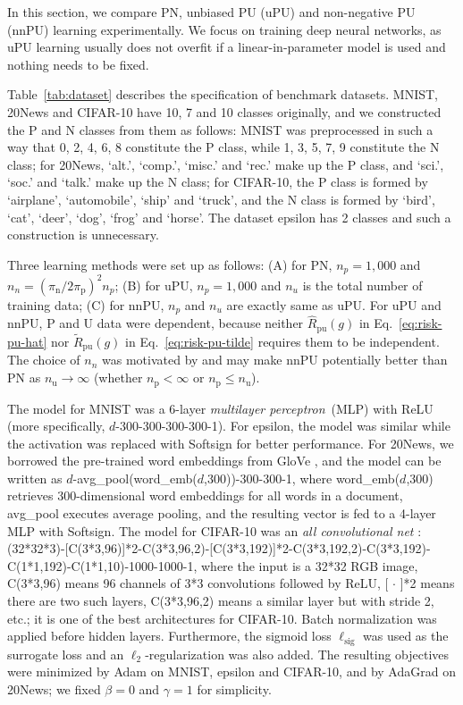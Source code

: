 \documentclass{article}
\newcommand{\pip}{\pi_\mathrm{p}}
\newcommand{\pin}{\pi_\mathrm{n}}
\newcommand{\Np}{{n_\mathrm{p}}}
\newcommand{\Nu}{{n_\mathrm{u}}}
\newcommand{\hRpu}{\widehat{R}_\mathrm{pu}}
\newcommand{\tRpu}{\widetilde{R}_\mathrm{pu}}
\newcommand{\ellsig}{\ell_\mathrm{sig}}
\begin{document}
In this section, we compare PN, unbiased PU (uPU) and non-negative PU (nnPU) learning experimentally. We focus on training deep neural networks, as uPU learning usually does not overfit if a linear-in-parameter model is used \citep{niu16nips} and nothing needs to be fixed.

Table~\ref{tab:dataset} describes the specification of benchmark datasets. MNIST, 20News and CIFAR-10 have 10, 7 and 10 classes originally, and we constructed the P and N classes from them as follows: MNIST was preprocessed in such a way that 0, 2, 4, 6, 8 constitute the P class, while 1, 3, 5, 7, 9 constitute the N class; for 20News, `alt.', `comp.', `misc.' and `rec.' make up the P class, and `sci.', `soc.' and `talk.' make up the N class; for CIFAR-10, the P class is formed by `airplane', `automobile', `ship' and `truck', and the N class is formed by `bird', `cat', `deer', `dog', `frog' and `horse'. The dataset epsilon has 2 classes and such a construction is unnecessary.

Three learning methods were set up as follows:
(A) for PN, $n_p=1,000$ and $n_n=(\pin/2\pip)^2n_p$;
(B) for uPU, $n_p=1,000$ and $n_u$ is the total number of training data;
(C) for nnPU, $n_p$ and $n_u$ are exactly same as uPU.
For uPU and nnPU, P and U data were dependent, because neither $\hRpu(g)$ in Eq.~\eqref{eq:risk-pu-hat} nor $\tRpu(g)$ in Eq.~\eqref{eq:risk-pu-tilde} requires them to be independent. The choice of $n_n$ was motivated by \citep{niu16nips} and may make nnPU potentially better than PN as $\Nu\to\infty$ (whether $\Np<\infty$ or $\Np\le\Nu$).

The model for MNIST was a 6-layer \emph{multilayer perceptron}~(MLP) with ReLU \citep{nair10icml} (more specifically, $d$-300-300-300-300-1). For epsilon, the model was similar while the activation was replaced with Softsign \citep{glorot10aistats} for better performance. For 20News, we borrowed the pre-trained word embeddings from GloVe \citep{pennington14emnlp}, and the model can be written as $d$-avg\_pool(word\_emb($d$,300))-300-300-1, where word\_emb($d$,300) retrieves 300-dimensional word embeddings for all words in a document, avg\_pool executes average pooling, and the resulting vector is fed to a 4-layer MLP with Softsign. The model for CIFAR-10 was an \emph{all convolutional net} \citep{springenberg15iclr}: (32*32*3)-[C(3*3,96)]*2-C(3*3,96,2)-[C(3*3,192)]*2-C(3*3,192,2)-C(3*3,192)-C(1*1,192)-C(1*1,10)-1000-1000-1, where the input is a 32*32 RGB image, C(3*3,96) means 96 channels of 3*3 convolutions followed by ReLU, [ $\cdot$ ]*2 means there are two such layers, C(3*3,96,2) means a similar layer but with stride 2, etc.; it is one of the best architectures for CIFAR-10. Batch normalization \citep{ioffe15icml} was applied before hidden layers. Furthermore, the sigmoid loss $\ellsig$ was used as the surrogate loss and an $\ell_2$-regularization was also added. The resulting objectives were minimized by Adam \citep{kingma15iclr} on MNIST, epsilon and CIFAR-10, and by AdaGrad \citep{duchi11jmlr} on 20News; we fixed $\beta=0$ and $\gamma=1$ for simplicity.
\end{document}
